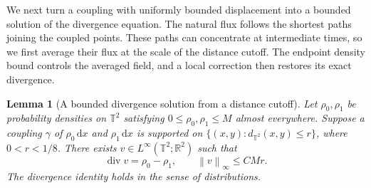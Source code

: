 \documentclass[11pt]{article}
\newcommand{\R}{\mathbb R}
\newcommand{\T}{\mathbb T^2}
\newcommand{\diver}{\operatorname{div}}
\newcommand{\norm}[1]{\left\lVert #1\right\rVert}
\newtheorem{lemma}[theorem]{Lemma}
\theoremstyle{remark}
\numberwithin{equation}{section}
\begin{document}
We next turn a coupling with uniformly bounded displacement into a
bounded solution of the divergence equation. The natural flux follows
the shortest paths joining the coupled points. These paths can
concentrate at intermediate times, so we first average their flux at
the scale of the distance cutoff. The endpoint density bound controls
the averaged field, and a local correction then restores its exact
divergence.

\begin{lemma}[A bounded divergence solution from a distance cutoff]
\label{lem:bounded-flux}
Let \(\rho_0,\rho_1\) be probability densities on \(\T\) satisfying
\(0\le\rho_0,\rho_1\le M\) almost everywhere. Suppose a coupling
\(\gamma\) of \(\rho_0\,\mathrm dx\) and
\(\rho_1\,\mathrm dx\) is supported on
\(\{(x,y):d_{\T}(x,y)\le r\}\), where \(0<r<1/8\).
There exists \(v\in L^\infty(\T;\R^2)\) such that
\[
 \diver v=\rho_0-\rho_1,\qquad
 \norm v_\infty\le CMr.
\]
The divergence identity holds in the sense of distributions.
\end{lemma}
\end{document}
